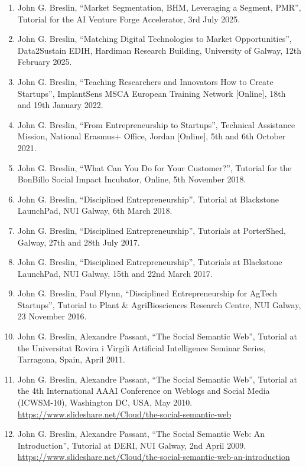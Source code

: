 \documentclass[10pt,a4paper]{res} %
\begin{document}
\begin{resume}
\begin{enumerate} \itemsep -2pt
\item John G. Breslin, ``Market Segmentation, BHM, Leveraging a Segment, PMR'', Tutorial for the AI Venture Forge Accelerator, 3rd July 2025.
\item John G. Breslin, ``Matching Digital Technologies to Market Opportunities'', Data2Sustain EDIH, Hardiman Research Building, University of Galway, 12th February 2025.
\item John G. Breslin, ``Teaching Researchers and Innovators How to Create Startups'', ImplantSens MSCA European Training Network [Online], 18th and 19th January 2022.
\item John G. Breslin, ``From Entrepreneurship to Startups'', Technical Assistance Mission, National Erasmus+ Office, Jordan [Online], 5th and 6th October 2021. %
\item John G. Breslin, ``What Can You Do for Your Customer?'', Tutorial for the BonBillo Social Impact Incubator, Online, 5th November 2018. %
\item John G. Breslin, ``Disciplined Entrepreneurship'', Tutorial at Blackstone LaunchPad, NUI Galway, 6th March 2018. %
\item John G. Breslin, ``Disciplined Entrepreneurship'', Tutorials at PorterShed, Galway, 27th and 28th July 2017. %
\item John G. Breslin, ``Disciplined Entrepreneurship'', Tutorials at Blackstone LaunchPad, NUI Galway, 15th and 22nd March 2017. %
\item John G. Breslin, Paul Flynn, ``Disciplined Entrepreneurship for AgTech Startups'', Tutorial to Plant \& AgriBiosciences Research Centre, NUI Galway, 23 November 2016. %
\item John G. Breslin, Alexandre Passant, ``The Social Semantic Web'', Tutorial at the Universitat Rovira i Virgili Artificial Intelligence Seminar Series, Tarragona, Spain, April 2011. %
\item John G. Breslin, Alexandre Passant, ``The Social Semantic Web'', Tutorial at the 4th International AAAI Conference on Weblogs and Social Media (ICWSM-10), Washington DC, USA, May 2010. \url{https://www.slideshare.net/Cloud/the-social-semantic-web}
\item John G. Breslin, Alexandre Passant, ``The Social Semantic Web: An Introduction'', Tutorial at DERI, NUI Galway, 2nd April 2009. \url{https://www.slideshare.net/Cloud/the-social-semantic-web-an-introduction}

\end{enumerate}
\end{resume}
\end{document}

